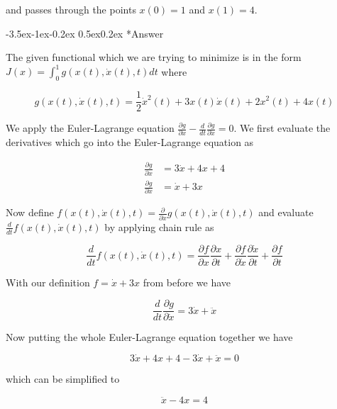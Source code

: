 \documentclass[11pt,letterpaper,onecolumn,notitlepage]{article}
\makeatletter
\renewcommand\subsection{\@startsection{subsection}{1}{\z@}%
{-3.5ex\@plus-1ex\@minus-0.2ex}%
{0.5ex\@plus0.2ex}%
{\fontsize{10pt}{10pt}\selectfont\bfseries\sffamily}}
\makeatother
\begin{document}
  and passes through the points $x(0)=1$ and $x(1)=4$.

  \subsection*{Answer}

  The given functional which we are trying to minimize is in the form $J(x)=\int_{0}^{1}g(x(t),\dot{x}(t),t)dt$ where

  \begin{equation*}
  g(x(t),\dot{x}(t),t)=\frac{1}{2}\dot{x}^{2}(t)+3x(t)\dot{x}(t)+2x^{2}(t)+4x(t)
  \end{equation*}

  We apply the Euler-Lagrange equation $\frac{\partial{}g}{\partial{}x}-\frac{d}{dt}\frac{\partial{}g}{\partial\dot{x}}=0$.
  We first evaluate the derivatives which go into the Euler-Lagrange equation as

  \begin{align*}
  \frac{\partial{}g}{\partial{}x}&=3\dot{x}+4x+4 \\
  \frac{\partial{}g}{\partial\dot{x}}&=\dot{x}+3x
  \end{align*}

  Now define $f(x(t),\dot{x}(t),t)=\frac{\partial}{\partial\dot{x}}g(x(t),\dot{x}(t),t)$ and evaluate $\frac{d}{dt}f(x(t),\dot{x}(t),t)$ by applying chain rule as

  \begin{equation*}
    \frac{d}{dt}f(x(t),\dot{x}(t),t)=
    \frac{\partial{}f}{\partial{}x}\frac{\partial{}x}{\partial{}t}+
    \frac{\partial{}f}{\partial\dot{x}}\frac{\partial\dot{x}}{\partial{}t}+
    \frac{\partial{}f}{\partial{}t}
  \end{equation*}

  With our definition $f=\dot{x}+3x$ from before we have

  \begin{equation*}
    \frac{d}{dt}\frac{\partial{}g}{\partial\dot{x}}=3\dot{x}+\ddot{x}
  \end{equation*}

  Now putting the whole Euler-Lagrange equation together we have

  \begin{equation*}
    3\dot{x}+4x+4-3\dot{x}+\ddot{x}=0
  \end{equation*}

  which can be simplified to

  \begin{equation*}
    \ddot{x}-4x=4
  \end{equation*}
\end{document}
